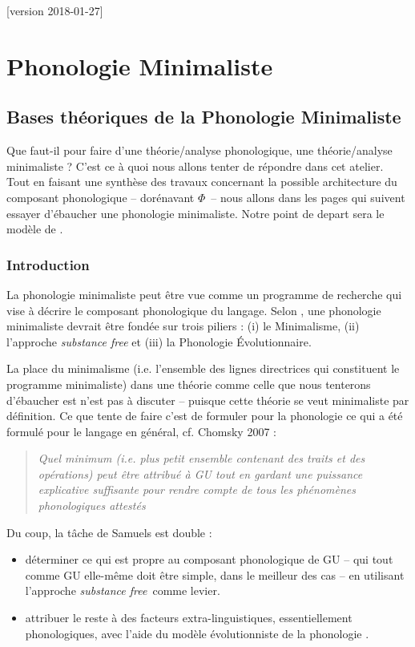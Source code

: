 [version 2018-01-27]
%


\chapter{Phonologie Minimaliste}	
  \sommaire
  
  \section{Bases th\'eoriques de la Phonologie Minimaliste}
    Que faut-il pour faire d'une th\'eorie/analyse phonologique, une th\'eorie/analyse minimaliste ? C'est ce \`a quoi nous allons tenter de r\'epondre dans cet atelier. Tout en faisant une synth\`ese des travaux concernant la possible architecture du composant phonologique -- dor\'enavant \newcommand\lphi{$ \Phi $} \lphi\ -- nous allons dans les pages qui suivent essayer d'\'ebaucher une phonologie minimaliste. Notre point de depart sera le mod\`ele de \cite{samuels2009structure,samuels2011architecture}.
    \subsection{Introduction}
    La phonologie minimaliste peut \^etre vue comme un programme de recherche qui vise \`a d\'ecrire le composant phonologique du langage. Selon \cite{samuels2009structure}, une phonologie minimaliste devrait \^etre fond\'ee sur trois piliers : (i) le Minimalisme, (ii) l'approche \textit{substance free} et (iii) la Phonologie \'Evolutionnaire. 
    
    La place du minimalisme (i.e. l'ensemble des lignes directrices qui constituent le programme minimaliste) dans une th\'eorie comme celle que nous tenterons d'\'ebaucher est n'est pas \`a discuter -- puisque cette th\'eorie se veut minimaliste par définition. 
    Ce que \cite{samuels2009structure} tente de faire c'est de formuler pour la phonologie ce qui a \'et\'e formul\'e pour le langage en g\'en\'eral, cf. Chomsky 2007 : 
    \begin{quote}
    \itshape	Quel minimum (i.e. plus petit ensemble contenant des traits et des op\'erations) peut \^etre attribu\'e \`a GU tout en gardant une puissance explicative suffisante pour rendre compte de tous les ph\'enom\`enes phonologiques attest\'es
    \end{quote}
\newcommand\sfree{\textit{substance free}}
    Du coup, la t\^ache de Samuels est double :
    \begin{itemize}
    	\item d\'eterminer ce qui est propre au composant phonologique de GU -- qui tout comme GU elle-m\^eme doit \^etre simple, dans le meilleur des cas -- en utilisant l'approche 
    	 \sfree\ comme levier.
    	\item attribuer le reste \`a des facteurs extra-linguistiques, essentiellement phonologiques, avec l'aide du mod\`ele \'evolutionniste de la phonologie \cite[cf.][]{blevins2004evolutionary}.
    \end{itemize}    
    
